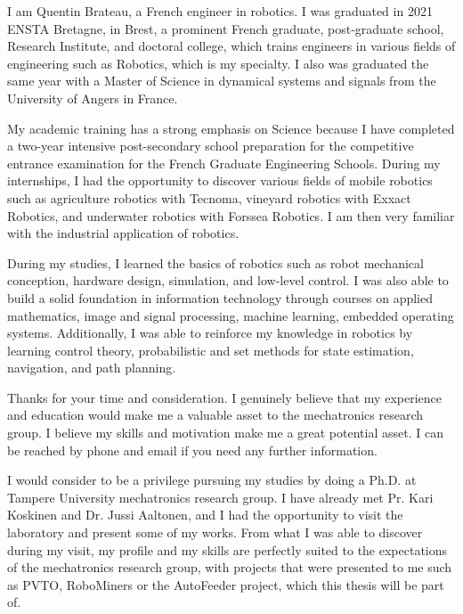 \documentclass[11pt, a4paper]{awesome-cv}
\begin{document}
	\makecvheader[C]


	\makelettertitle

	\begin{cvletter}

		I am Quentin Brateau, a French engineer in robotics. I was graduated in 2021 ENSTA Bretagne, in Brest, a prominent French graduate, post-graduate school, Research Institute, and doctoral college, which trains engineers in various fields of engineering such as Robotics, which is my specialty. I also was graduated the same year with a Master of Science in dynamical systems and signals from the University of Angers in France.

		My academic training has a strong emphasis on Science because I have completed a two-year intensive post-secondary school preparation for the competitive entrance examination for the French Graduate Engineering Schools. During my internships, I had the opportunity to discover various fields of mobile robotics such as agriculture robotics with Tecnoma, vineyard robotics with Exxact Robotics, and underwater robotics with Forssea Robotics. I am then very familiar with the industrial application of robotics.

		During my studies, I learned the basics of robotics such as robot mechanical conception, hardware design, simulation, and low-level control. I was also able to build a solid foundation in information technology through courses on applied mathematics, image and signal processing, machine learning, embedded operating systems. Additionally, I was able to reinforce my knowledge in robotics by learning control theory, probabilistic and set methods for state estimation, navigation, and path planning.

		Thanks for your time and consideration. I genuinely believe that my experience and education would make me a valuable asset to the mechatronics research group. I believe my skills and motivation make me a great potential asset. I can be reached by phone and email if you need any further information.

		
			I would consider to be a privilege pursuing my studies by doing a Ph.D. at Tampere University mechatronics research group. I have already met Pr. Kari Koskinen and Dr. Jussi Aaltonen, and I had the opportunity to visit the laboratory and present some of my works. From what I was able to discover during my visit, my profile and my skills are perfectly suited to the expectations of the mechatronics research group, with projects that were presented to me such as PVTO, RoboMiners or the AutoFeeder project, which this thesis will be part of.


\end{cvletter}
\end{document}

